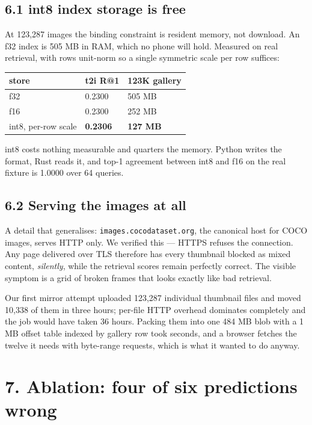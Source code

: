 \documentclass[
  11pt,
]{article}
\newcounter{none} %
\begin{document}
\subsection{6.1 int8 index storage is
free}\label{int8-index-storage-is-free}

At 123,287 images the binding constraint is resident memory, not
download. An f32 index is 505 MB in RAM, which no phone will hold.
Measured on real retrieval, with rows unit-norm so a single symmetric
scale per row suffices:

{\def\LTcaptype{none} %
\begin{longtable}[]{@{}lll@{}}
\toprule\noalign{}
store & t2i R@1 & 123K gallery \\
\midrule\noalign{}
\endhead
\bottomrule\noalign{}
\endlastfoot
f32 & 0.2300 & 505 MB \\
f16 & 0.2300 & 252 MB \\
int8, per-row scale & \textbf{0.2306} & \textbf{127 MB} \\
\end{longtable}
}

int8 costs nothing measurable and quarters the memory. Python writes the
format, Rust reads it, and top-1 agreement between int8 and f16 on the
real fixture is 1.0000 over 64 queries.

\subsection{6.2 Serving the images at
all}\label{serving-the-images-at-all}

A detail that generalises: \texttt{images.cocodataset.org}, the
canonical host for COCO images, serves HTTP only. We verified this ---
HTTPS refuses the connection. Any page delivered over TLS therefore has
every thumbnail blocked as mixed content, \emph{silently}, while the
retrieval scores remain perfectly correct. The visible symptom is a grid
of broken frames that looks exactly like bad retrieval.

Our first mirror attempt uploaded 123,287 individual thumbnail files and
moved 10,338 of them in three hours; per-file HTTP overhead dominates
completely and the job would have taken 36 hours. Packing them into one
484 MB blob with a 1 MB offset table indexed by gallery row took
seconds, and a browser fetches the twelve it needs with byte-range
requests, which is what it wanted to do anyway.

\section{7. Ablation: four of six predictions
wrong}\label{ablation-four-of-six-predictions-wrong}
\end{document}

